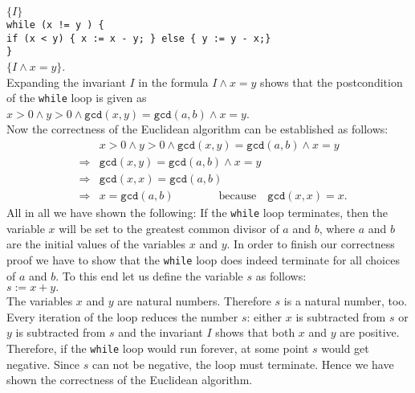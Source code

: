 \noindent
\hspace*{1.3cm} 
$\{ I \}$
\\[0.1cm]
\hspace*{2.2cm}
\texttt{while (x != y ) \{} \\[0.1cm]
\hspace*{3.2cm}
         \texttt{if (x < y) \{ x := x - y; \} else \{ y := y - x;\}}
\\[0.1cm]
\hspace*{2.2cm}
\texttt{\}} \quad 
\\[0.1cm]
\hspace*{1.3cm}
$\{ I \wedge x = y \}$. 
\\[0.2cm]
Expanding the invariant $I$ in the formula $I \wedge x = y$ shows that the postcondition of the 
\texttt{while} loop is given as
\\[0.2cm]
\hspace*{1.3cm}
$x > 0 \wedge y > 0 \wedge \texttt{gcd}(x,y) = \texttt{gcd}(a,b) \wedge x = y$.
\\[0.2cm]
Now the correctness of the Euclidean algorithm can be established as follows:
\begin{eqnarray*}
&             &  x > 0 \wedge y > 0 \wedge \texttt{gcd}(x,y) = \texttt{gcd}(a,b) \wedge x = y \\
& \Rightarrow & \texttt{gcd}(x,y) = \texttt{gcd}(a,b) \wedge x = y \\
& \Rightarrow & \texttt{gcd}(x,x) = \texttt{gcd}(a,b)  \\
& \Rightarrow & x = \texttt{gcd}(a,b) \qquad\qquad \mathrm{because} \quad \texttt{gcd}(x,x) = x.
\end{eqnarray*}
All in all we have shown the following: If the \texttt{while} loop terminates, then
the variable $x$ will be set to the greatest common divisor of $a$ and $b$, where $a$ and $b$ are
the initial values of the variables $x$ and $y$.  In order to finish our correctness proof we have
to show that the \texttt{while} loop does indeed terminate for all choices of $a$ and $b$.
To this end let us define the variable $s$ as follows:
\\[0.2cm]
\hspace*{1.3cm}
$ s := x + y. $
\\[0.2cm]
The variables $x$ and $y$ are natural numbers.  Therefore $s$ is a natural number, too.
Every iteration of the loop reduces the number $s$: either $x$ is subtracted from $s$
or $y$ is subtracted from  $s$ and the invariant $I$ shows that both $x$ and $y$ are
positive.  Therefore, if the \texttt{while} loop would run forever, at some point $s$ would get
negative.  Since $s$ can not be negative, the loop must terminate.
Hence we have shown the correctness of the Euclidean  algorithm.
\pagebreak

